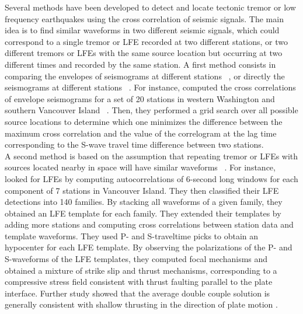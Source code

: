 \documentclass[draft]{agujournal2019}
\begin{document}
Several methods have been developed to detect and locate tectonic tremor or low frequency earthquakes using the cross correlation of seismic signals. The main idea is to find similar waveforms in two different seismic signals, which could correspond to a single tremor or LFE recorded at two different stations, or two different tremors or LFEs with the same source location but occurring at two different times and recorded by the same station. A first method consists in comparing the envelopes of seismograms at different stations ~\cite{OBA_2002, WEC_2008}, or directly the seismograms at different stations ~\cite{RUB_2013}. For instance,  computed the cross correlations of envelope seismograms for a set of 20 stations in western Washington and southern Vancouver Island ~\cite{WEC_2008}. Then, they performed a grid search over all possible source locations to determine which one minimizes the difference between the maximum cross correlation and the value of the correlogram at the lag time corresponding to the S-wave travel time difference between two stations. \\

A second method is based on the assumption that repeating tremor or LFEs with sources located nearby in space will have similar waveforms ~\cite{BOS_2012, ROY_2014, SHE_2007_nature, SHE_2006}. For instance,  looked for LFEs by computing autocorrelations of 6-second long windows for each component of 7 stations in Vancouver Island. They then classified their LFE detections into 140 families. By stacking all waveforms of a given family, they obtained an LFE template for each family. They extended their templates by adding more stations and computing cross correlations between station data and template waveforms. They used P- and S-traveltime picks to obtain an hypocenter for each LFE template. By observing the polarizations of the P- and S-waveforms of the LFE templates, they computed focal mechanisms and obtained a mixture of strike slip and thrust mechanisms, corresponding to a compressive stress field consistent with thrust faulting parallel to the plate interface. Further study showed that the average double couple solution is generally consistent with shallow thrusting in the direction of plate motion \cite{ROY_2014}. \\
\end{document}
